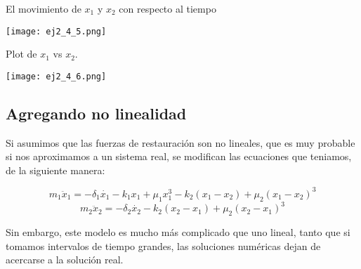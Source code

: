 \documentclass[12pt]{article}
\begin{document}
\begin{itemize}
\begin{itemize}
El movimiento de $x_1$ y $x_2$ con respecto al tiempo

\begin{center}
        \texttt{[image: ej2\_4\_5.png]}
\end{center}

Plot de $x_1$ vs $x_2$.

\begin{center}
        \texttt{[image: ej2\_4\_6.png]}
\end{center}

\end{itemize}

\end{itemize}

\subsection{Agregando no linealidad}

Si asumimos que las fuerzas de restauración son no lineales, que es muy probable si nos aproximamos a un sistema real, se modifican las ecuaciones que teniamos, de la siguiente manera: 

\begin{equation}
m_1 \ddot x_1 = -\delta _1 \dot{x_1} -k_1x_1 +\mu _1 x_1 ^3- k_2(x_1-x_2) + \mu _2 (x_1-x_2)^3
\end{equation}
\begin{equation}
m_2 \ddot x_2 = -\delta _2 \dot{x_2} -k_2(x_2-x_1) +\mu _2 (x_2-x_1)^3
\end{equation} 

Sin embargo, este modelo es mucho más complicado que uno lineal, tanto que si tomamos intervalos de tiempo grandes, las soluciones numéricas dejan de acercarse a la solución real. 
\end{document}

